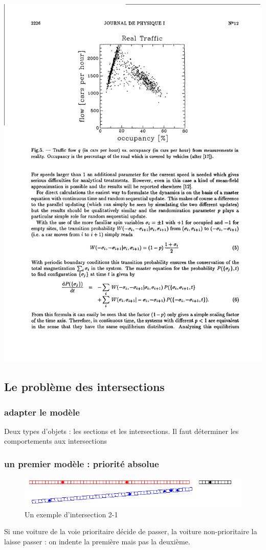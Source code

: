 \documentclass[slidetop,11pt]{beamer}
\begin{document}
\begin{frame}
\includegraphics[scale = 0.7]{./images/dfondcompre}
\end{frame}

	\subsection{Le problème des intersections}
\begin{frame}
\frametitle{adapter le modèle}
	Deux types d'objets : les sections et les intersections. Il faut déterminer les comportements aux intersections
\end{frame}	

\begin{frame}
	\frametitle{un premier modèle : priorité absolue}
	\begin{figure}
		\begin{center}
			\includegraphics[scale=0.5]{./images/localdebut}
		\end{center}
		\caption{Un exemple d'intersection 2-1}
	\end{figure}
	
	Si une voiture de la voie prioritaire décide de passer, la voiture non-prioritaire la laisse passer : on indente la première mais pas la deuxième.
\end{frame}	
	
\end{document}
